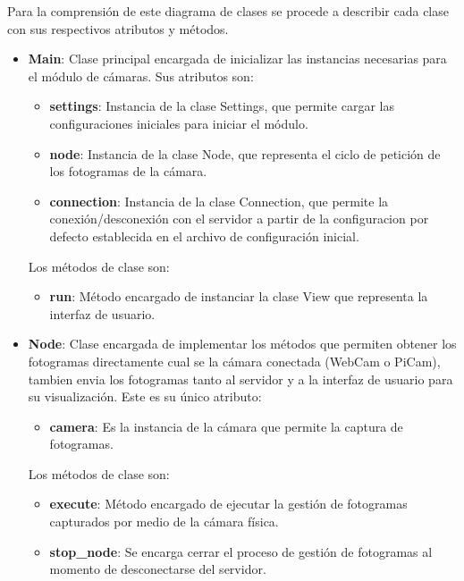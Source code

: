 Para la comprensión de este diagrama de clases se procede a describir cada clase con sus respectivos atributos y métodos.\\

\begin{itemize}
    \item \textbf{Main}: Clase principal encargada de inicializar las instancias necesarias para el módulo de cámaras. Sus atributos son:
        \begin{itemize}
            \item \textbf{settings}: Instancia de la clase Settings, que permite cargar las configuraciones iniciales para iniciar el módulo.
            \item \textbf{node}: Instancia de la clase Node, que representa el ciclo de petición de los fotogramas de la cámara.
            \item \textbf{connection}: Instancia de la clase Connection, que permite la conexión/desconexión con el servidor a partir de la configuracion por defecto establecida en el archivo de configuración inicial.
        \end{itemize}
        Los métodos de clase son:
        \begin{itemize}
            \item \textbf{run}: Método encargado de instanciar la clase View que representa la interfaz de usuario.
        \end{itemize}
    \item \textbf{Node}: Clase encargada de implementar los métodos que permiten obtener los fotogramas directamente cual se la cámara conectada (WebCam o PiCam), tambien envia los fotogramas tanto al servidor y a la interfaz de usuario para su visualización. Este es su único atributo:
        \begin{itemize}
            \item \textbf{camera}: Es la instancia de la cámara que permite la captura de fotogramas.            
        \end{itemize}
        Los métodos de clase son:
        \begin{itemize}
            \item \textbf{execute}: Método encargado de ejecutar la gestión de fotogramas capturados por medio de la cámara física.
            \item \textbf{stop\_node}: Se encarga cerrar el proceso de gestión de fotogramas al momento de desconectarse del servidor.
        \end{itemize}

\end{itemize}
